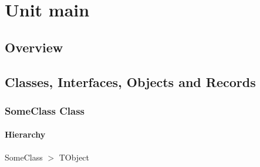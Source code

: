 \documentclass{report}
\newif\ifpdf
\begin{document}
\label{toc}\tableofcontents
\newpage
\newlength{\tmplength}
\chapter{Unit main}
\label{main}
\section{Overview}
\begin{description}
\item[\texttt{\begin{ttfamily}SomeClass\end{ttfamily} Class}]
\end{description}
\section{Classes, Interfaces, Objects and Records}
\ifpdf
\subsection*{\large{\textbf{SomeClass Class}}\normalsize\hspace{1ex}\hrulefill}
\else
\subsection*{SomeClass Class}
\fi
\label{main.SomeClass}
\subsubsection*{\large{\textbf{Hierarchy}}\normalsize\hspace{1ex}\hfill}
SomeClass {$>$} TObject
\end{document}
